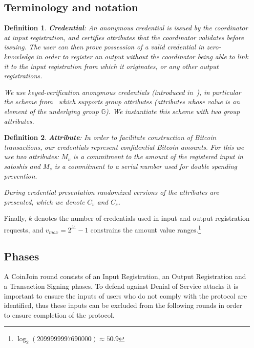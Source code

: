 \documentclass{article}
\newtheorem{definition}{Definition}[section]
\begin{document}
\subsection{Terminology and notation}

\begin{definition} \textbf{Credential}:
An anonymous credential is issued by the coordinator at input registration, and certifies attributes that the coordinator validates before issuing. The user can then prove possession of a valid credential in zero-knowledge in order to register an output without the coordinator being able to link it to the input registration from which it originates, or any other output registrations.

We use keyed-verification anonymous credentials (introduced in~\cite{chase2014algebraic}), in particular the scheme from~\cite{chase2019signal} which supports group attributes (attributes whose value is an element of the underlying group $\mathbb{G}$). We instantiate this scheme with two group attributes.
\end{definition}

\begin{definition}\textbf{Attribute}:
In order to facilitate construction of Bitcoin transactions, our credentials represent confidential Bitcoin amounts. For this we use two attributes: $M_v$ is a commitment to the amount of the registered input in satoshis and $M_s$ is a commitment to a serial number used for double spending prevention.

During credential presentation randomized versions of the attributes are presented, which we denote $C_v$ and $C_s$.
\end{definition}

Finally, $k$ denotes the number of credentials used in input and output registration requests, and $v_{\mathit{max}} = 2^{51}-1$ constrains the amount value ranges.\footnote{$\log_2(2099999997690000) \approx 50.9$}

\subsection{Phases}

A CoinJoin round consists of an Input Registration, an Output Registration and a Transaction Signing phases. To defend against Denial of Service attacks it is important to ensure the inputs of users who do not comply with the protocol are identified, thus these inputs can be excluded from the following rounds in order to ensure completion of the protocol.
\end{document}
